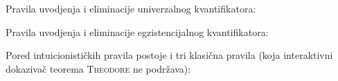 \documentclass[a4paper,10pt]{article}
\theoremstyle{definition}
\begin{document}
Pravila uvodjenja i eliminacije univerzalnog kvantifikatora:

\begin{center}
    \begin{minipage}{0.4\textwidth}
        \begin{prooftree}[$\forall_{I}$]
        \end{prooftree}
    \end{minipage}
    \begin{minipage}{0.5\textwidth}
        \begin{prooftree}[$\forall_{E}$]
        \end{prooftree}
    \end{minipage}
\end{center}

Pravila uvodjenja i eliminacije egzistencijalnog kvantifikatora:

\begin{center}
    \begin{minipage}{0.4\textwidth}
        \begin{prooftree}[$\exists_{I}$]
        \end{prooftree}
    \end{minipage}
    \begin{minipage}{0.5\textwidth}
        \begin{prooftree}[$\exists_{E}$]
        \end{prooftree}
    \end{minipage}
\end{center}

Pored intuicionističkih pravila postoje i tri klasična pravila (koja interaktivni dokazivač teorema \textsc{Theodore} ne podržava):
\end{document}
